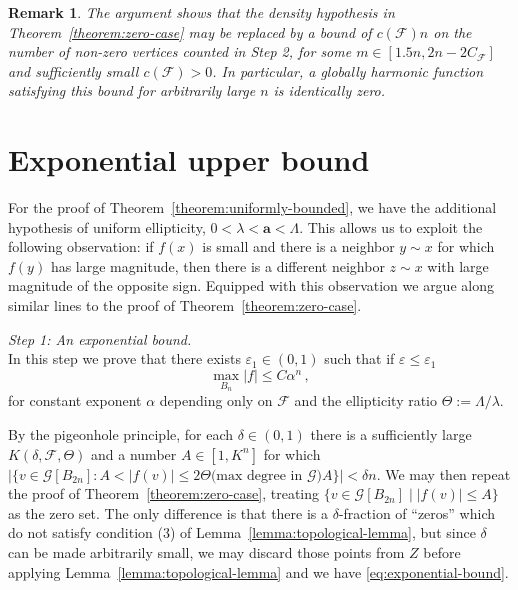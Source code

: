 \documentclass{daj}
\newtheorem{remark}[theorem]{Remark}
\newcommand{\G}{\mathcal{G}}
\newcommand{\cond}{\mathbf{a}}
\newcommand{\eps}{\varepsilon}
\begin{document}
\begin{remark}
	The argument shows that the density hypothesis in Theorem~\ref{theorem:zero-case} may be replaced by a bound of $c(\mathcal F)n$ on the number of non-zero vertices counted in Step 2, for some $m\in[1.5n,2n-2C_{\mathcal F}]$ and sufficiently small $c(\mathcal F)>0$.
	In particular, a globally harmonic function satisfying this bound for arbitrarily large $n$ is identically zero.
\end{remark}


\section{Exponential upper bound}\label{sec:bounded-case}
For the proof of Theorem~\ref{theorem:uniformly-bounded}, we have the additional hypothesis of uniform ellipticity,
$0 < \lambda < \cond < \Lambda$. This allows us to exploit the following observation: if $f(x)$ is small
and there is a neighbor $y \sim x$ for which $f(y)$ has large magnitude,  then there is a different neighbor $z \sim x$ with large magnitude
of the opposite sign.  Equipped with this observation we argue along similar lines to the proof of Theorem~\ref{theorem:zero-case}.
\smallskip

{\it Step 1: An exponential bound.} \\
In this step we prove that there exists $\eps_1 \in (0,1)$ such that if $\eps \leq \eps_1$
\begin{equation} \label{eq:exponential-bound}
	\max_{B_n} |f| \leq C \alpha^n \, ,
\end{equation}
for constant exponent $\alpha$ depending only on $\mathcal{F}$ and the ellipticity ratio $\Theta := \Lambda/\lambda$.

By the pigeonhole principle, for each $\delta\in(0,1)$ there is a sufficiently large $K(\delta,\mathcal F,\Theta)$ and a number $A\in[1,K^n]$ for which
$|\{v\in\G[B_{2n}]:A<|f(v)|\leq2\Theta\mbox{(max degree in $\G$)}A\}|<\delta n$.
We may then repeat the proof of Theorem~\ref{theorem:zero-case}, treating $\{v \in \G[B_{2 n }] \mid |f(v)| \leq  A\}$
as the zero set. The only difference is that there is a $\delta$-fraction of ``zeros''
which do not satisfy condition (3) of Lemma~\ref{lemma:topological-lemma}, but since $\delta$ can be
made arbitrarily small, we may discard those points from $Z$ before applying Lemma~\ref{lemma:topological-lemma} and we have \eqref{eq:exponential-bound}.
\smallskip
\end{document}
